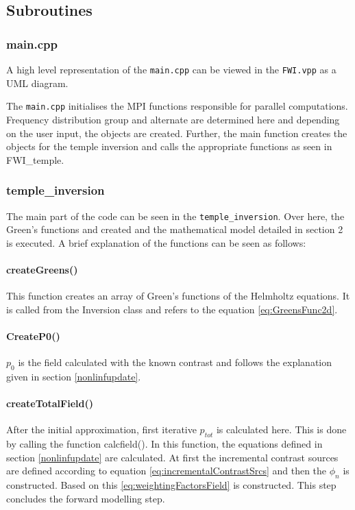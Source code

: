 \documentclass[10pt,a4paper]{article}
\begin{document}
\subsection{Subroutines}
\subsubsection{main.cpp}

A high level representation of the \texttt{main.cpp} can be viewed in
the \texttt{FWI.vpp} as a UML diagram.
\newline

The \texttt{main.cpp} initialises the MPI functions responsible for parallel
computations. Frequency distribution group and alternate are
determined here and depending on the user input, the objects are
created. Further, the main function creates the objects for the temple
inversion and calls the appropriate functions as seen in FWI\_temple.

\subsubsection{temple\_inversion}

The main part of the code can be seen in the
\texttt{temple\_inversion}. Over here, the Green's functions and
created and the mathematical model detailed in section 2 is executed.
A brief explanation of the functions can be seen as follows:

\paragraph{createGreens()}

This function creates an array of Green's functions of the Helmholtz
equations. It is called from the Inversion class and refers to the
equation \ref{eq:GreensFunc2d}.

\paragraph{CreateP0()}
$p_0$ is the field calculated with the known contrast and follows the
explanation given in section \ref{nonlinfupdate}.

\paragraph{createTotalField()}

After the initial approximation, first iterative $p_{tot}$ is
calculated here. This is done by calling the function calcfield(). In
this function, the equations defined in section \ref{nonlinfupdate} are calculated.
At first the incremental contrast sources are defined according to
equation \ref{eq:incrementalContrastSrcs} and then the $\phi_n$ is constructed. Based on
this \ref{eq:weightingFactorsField} is constructed. This step concludes the forward
modelling step.\\
\end{document}

